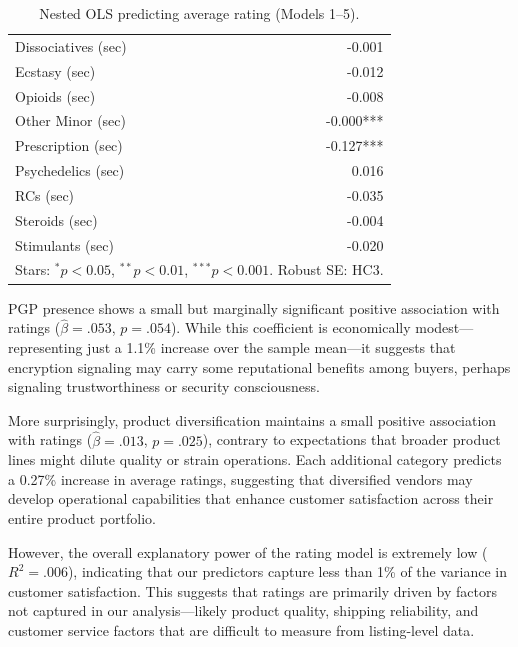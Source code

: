 \documentclass{article}
\begin{document}
\begin{table}[htbp]
\begin{tabular}{lrrrrr}
    Dissociatives (sec)       &          &           &           &           & -0.001\\
    Ecstasy (sec)             &          &           &           &           & -0.012\\
    Opioids (sec)             &          &           &           &           & -0.008\\
    Other Minor (sec)         &          &           &           &           & -0.000***\\
    Prescription (sec)        &          &           &           &           & -0.127***\\
    Psychedelics (sec)        &          &           &           &           & 0.016\\
    RCs (sec)                 &          &           &           &           & -0.035\\
    Steroids (sec)            &          &           &           &           & -0.004\\
    Stimulants (sec)          &          &           &           &           & -0.020\\
    \midrule
    \multicolumn{6}{l}{\footnotesize Stars: $^{*}p<0.05$, $^{**}p<0.01$, $^{***}p<0.001$. Robust SE: HC3.}\\
    \bottomrule
  \end{tabular}
  \caption{Nested OLS predicting average rating (Models 1–5).}
  \label{tab:ols_rating_nested}
\end{table}


PGP presence shows a small but marginally significant positive association with ratings ($\hat\beta = .053$, $p = .054$). While this coefficient is economically modest—representing just a 1.1\% increase over the sample mean—it suggests that encryption signaling may carry some reputational benefits among buyers, perhaps signaling trustworthiness or security consciousness.

More surprisingly, product diversification maintains a small positive association with ratings ($\hat\beta = .013$, $p = .025$), contrary to expectations that broader product lines might dilute quality or strain operations. Each additional category predicts a 0.27\% increase in average ratings, suggesting that diversified vendors may develop operational capabilities that enhance customer satisfaction across their entire product portfolio.

However, the overall explanatory power of the rating model is extremely low ($R^2 = .006$), indicating that our predictors capture less than 1\% of the variance in customer satisfaction. This suggests that ratings are primarily driven by factors not captured in our analysis—likely product quality, shipping reliability, and customer service factors that are difficult to measure from listing-level data.
\end{document}
